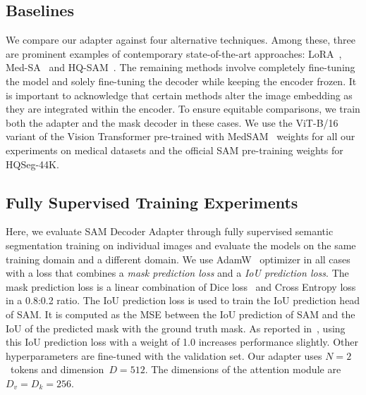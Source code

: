 \subsection{Baselines}
We compare our adapter against four alternative techniques. Among these, three are prominent examples of contemporary state-of-the-art approaches: LoRA~, Med-SA~ and HQ-SAM~. The remaining methods involve completely fine-tuning the model and solely fine-tuning the decoder while keeping the encoder frozen. It is important to acknowledge that certain methods alter the image embedding as they are integrated within the encoder. To ensure equitable comparisons, we train both the adapter and the mask decoder in these cases. We use the ViT-B/16~ variant of the Vision Transformer pre-trained with MedSAM~ weights for all our experiments on medical datasets and the official SAM pre-training weights for HQSeg-44K.


\subsection{Fully Supervised Training Experiments}
Here, we evaluate SAM Decoder Adapter through fully supervised semantic segmentation training on individual images and evaluate the models on the same training domain and a different domain. 
We use AdamW~ optimizer in all cases with a loss that combines a \emph{mask prediction loss} and a \emph{IoU prediction loss}. The mask prediction loss is a linear combination of Dice loss~ and Cross Entropy loss in a 0.8:0.2 ratio. The IoU prediction loss is used to train the IoU prediction head of SAM. It is computed as the MSE between the IoU prediction of SAM and the IoU of the predicted mask with the ground truth mask. As reported in~, using this IoU prediction loss with a weight of 1.0 increases performance slightly. Other hyperparameters are fine-tuned with the validation set. Our adapter uses $N=2$~tokens and dimension~$D=512$. The dimensions of the attention module are~$D_v=D_k=256$.

